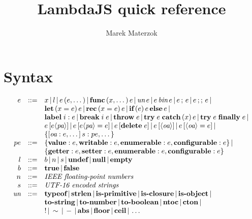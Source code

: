 \documentclass[draft, 10pt]{article}
\title{LambdaJS quick reference}
\author{Marek Materzok}
\newcommand{\expr}[0]{e}
\newcommand{\var}[0]{x}
\newcommand{\lit}[0]{l}
\newcommand{\bool}[0]{b}
\newcommand{\num}[0]{n}
\newcommand{\str}[0]{s}
\newcommand{\id}[0]{i}
\newcommand{\eprop}[0]{pe}
\newcommand{\undef}[0]{\textbf{undef}}
\newcommand{\nul}[0]{\textbf{null}}
\newcommand{\empt}[0]{\textbf{empty}}
\newcommand{\true}[0]{\textbf{true}}
\newcommand{\false}[0]{\textbf{false}}
\newcommand{\unop}[0]{\textit{un}}
\newcommand{\binop}[0]{\textit{bin}}
\newcommand{\pattr}[0]{\textit{pa}}
\newcommand{\oattr}[0]{\textit{oa}}
\newcommand{\pavalue}[0]{\textbf{value}}
\newcommand{\pawritable}[0]{\textbf{writable}}
\newcommand{\paget}[0]{\textbf{getter}}
\newcommand{\paset}[0]{\textbf{setter}}
\newcommand{\paenum}[0]{\textbf{enumerable}}
\newcommand{\paconfig}[0]{\textbf{configurable}}
\newcommand{\unap}[1]{\unop \thinspace #1}
\newcommand{\binap}[2]{#1 \thinspace \binop \thinspace #2}
\newcommand{\ap}[2]{#1\thinspace(#2)}
\newcommand{\func}[2]{\textbf{func}\thinspace(#1)\thinspace #2}
\newcommand{\seq}[2]{#1 \thinspace ; \thinspace #2}
\newcommand{\jseq}[2]{#1 \thinspace ;; \thinspace #2}
\newcommand{\letdef}[3]{\textbf{let} \thinspace (#1 = #2) \thinspace #3}
\newcommand{\recdef}[3]{\textbf{rec} \thinspace (#1 = #2) \thinspace #3}
\newcommand{\ife}[3]{\textbf{if} \thinspace (#1) \thinspace #2 \thinspace \textbf{else} \thinspace #3}
\newcommand{\lbl}[2]{\textbf{label} \thickspace #1: #2}
\newcommand{\brk}[2]{\textbf{break} \thickspace #1 \thickspace #2}
\newcommand{\throw}[1]{\textbf{throw} \thickspace #1}
\newcommand{\trycatch}[3]{\textbf{try} \thickspace #1 \thickspace \textbf{catch}\thinspace(#2) \thinspace #3}
\newcommand{\tryfin}[2]{\textbf{try} \thickspace #1 \thickspace \textbf{finally} \thickspace #2}
\newcommand{\getattr}[3]{#2 \thinspace [ #3 \langle #1 \rangle ] }
\newcommand{\setattr}[4]{#2 \thinspace [ #3 \langle #1 \rangle = #4 ] }
\newcommand{\delattr}[2]{#1 \thinspace [ \textbf{delete} \thickspace #2 ]}
\newcommand{\getoattr}[2]{#2 \thinspace [ \langle #1 \rangle ]}
\newcommand{\setoattr}[3]{#2 \thinspace [ \langle #1 \rangle = #3 ]}
\newcommand{\bnfsep}[0]{\thinspace | \thinspace}
\newcommand{\optypeof}[0]{\textbf{typeof}}
\newcommand{\opstrlen}[0]{\textbf{strlen}}
\newcommand{\opisprim}[0]{\textbf{is-primitive}}
\newcommand{\opisclosure}[0]{\textbf{is-closure}}
\newcommand{\opisobject}[0]{\textbf{is-object}}
\newcommand{\optostr}[0]{\textbf{to-string}}
\newcommand{\optonum}[0]{\textbf{to-number}}
\newcommand{\optobool}[0]{\textbf{to-boolean}}
\newcommand{\opabs}[0]{\textbf{abs}}
\newcommand{\opfloor}[0]{\textbf{floor}}
\newcommand{\opceil}[0]{\textbf{ceil}}
\newcommand{\opntoc}[0]{\textbf{ntoc}}
\newcommand{\opcton}[0]{\textbf{cton}}
\newcommand{\opnot}[0]{!}
\newcommand{\opbnot}[0]{\sim}
\newcommand{\opneg}[0]{-}
\begin{document}
\maketitle

\section{Syntax}

\[
\begin{array}{rcl}
\expr & ::= & \var \bnfsep \lit \bnfsep \ap{\expr}{\expr, \dots} \bnfsep
              \func{\var, \dots}{\expr} \bnfsep
              \unap{\expr} \bnfsep \binap{\expr}{\expr} \bnfsep
              \seq{\expr}{\expr} \bnfsep \jseq{\expr}{\expr} \bnfsep \\
          & & \letdef{\var}{\expr}{\expr} \bnfsep \recdef{\var}{\expr}{\expr} \bnfsep
              \ife{\expr}{\expr}{\expr} \bnfsep \\
          & & \lbl{\id}{\expr} \bnfsep \brk{\id}{\expr} \bnfsep
              \throw{\expr} \bnfsep \trycatch{\expr}{\var}{\expr} \bnfsep \tryfin{\expr}{\expr} \bnfsep \\
          & & \getattr{\pattr}{\expr}{\expr} \bnfsep \setattr{\pattr}{\expr}{\expr}{\expr} \bnfsep
              \delattr{\expr}{\expr} \bnfsep \getoattr{\oattr}{\expr} \bnfsep 
              \setoattr{\oattr}{\expr}{\expr} \bnfsep \\
          & & \{[\oattr: \expr, \dots] \thinspace \str : \eprop, \dots \} \\
\eprop & ::= & \{\pavalue : \expr, \pawritable : \expr, \paenum : \expr, \paconfig : \expr \} \bnfsep \\
           & & \{\paget : \expr, \paset : \expr, \paenum : \expr, \paconfig : \expr \} \\
\lit & ::= & \bool \bnfsep \num \bnfsep \str \bnfsep \undef \bnfsep \nul \bnfsep \empt \\
\bool & ::= & \true \bnfsep \false \\
\num & ::= & \textit{IEEE floating-point numbers} \\
\str & ::= & \textit{UTF-16 encoded strings} \\
\unop & ::= & \optypeof \bnfsep \opstrlen \bnfsep \opisprim \bnfsep \opisclosure \bnfsep \opisobject \bnfsep \\
      && \optostr \bnfsep \optonum \bnfsep \optobool \bnfsep \opntoc \bnfsep \opcton \bnfsep \\
      && \opnot \bnfsep \opbnot \bnfsep \opneg \bnfsep \opabs \bnfsep \opfloor \bnfsep \opceil \bnfsep  \dots \\

\end{array}\]
\end{document}
